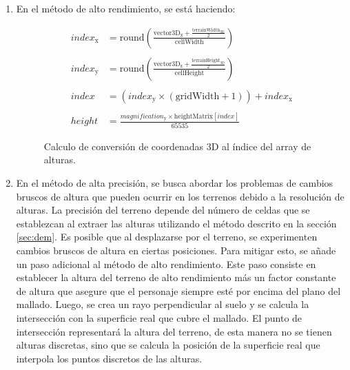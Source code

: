 \documentclass[a4paper, 11pt]{book}
\begin{document}
\begin{enumerate}
    \item En el método de alto rendimiento, se está haciendo:
    \begin{figure}[h]
        \begin{align*}
        index_{\text{x}} &=\mathbf{\mathrm{round}}\left(\frac{\mathbf{\mathrm{vector3D}}_{\text{x}} + \frac{\mathbf{\mathrm{terrainWidth}}_{\text{3D}}}{2}}{\mathbf{\mathrm{cellWidth}}}\right) \\\\
        index_{\text{y}} &=\mathbf{\mathrm{round}}\left(\frac{\mathbf{\mathrm{vector3D}}_{\text{z}} + \frac{\mathbf{\mathrm{terrainHeight}}_{\text{3D}}}{2}}{\mathbf{\mathrm{cellHeight}}}\right) \\\\
        index_{} &=(index_{\text{y}} \times (\mathbf{\mathrm{gridWidth}} + 1 )) + index_{\text{x}} \\\\
        height{} &=\frac{magnification_{\text{y}} \times \mathbf{\mathrm{heightMatrix}}[index_{}]}{65535}
        \end{align*}
    \caption{Calculo de conversión de coordenadas 3D al índice del array de alturas.}
    \label{formula:calculoIndiceAlturas}
    \end{figure}
    \item En el método de alta precisión, se busca abordar los problemas de cambios bruscos de altura que pueden ocurrir en los terrenos debido a la resolución de alturas.
    La precisión del terreno depende del número de celdas que se establezcan al extraer las alturas utilizando el método descrito en la sección \ref{sec:dem}.
    Es posible que al desplazarse por el terreno, se experimenten cambios bruscos de altura en ciertas posiciones. Para mitigar esto, se añade un paso adicional al método de alto rendimiento.
    Este paso consiste en establecer la altura del terreno de alto rendimiento más un factor constante de altura que asegure que el personaje siempre esté por encima del plano del mallado. Luego, se crea un rayo perpendicular al suelo y se calcula la intersección con la superficie real que cubre el mallado. 
    El punto de intersección representará la altura del terreno, de esta manera no se tienen alturas discretas, sino que se calcula la posición de la superficie real que interpola los puntos discretos de las alturas.
\end{enumerate}
\end{document}
